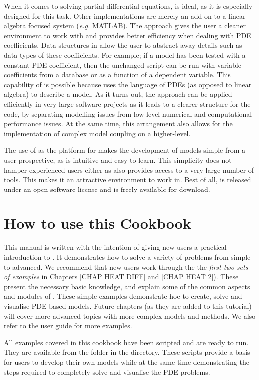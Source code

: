 When it comes to solving partial differential equations, \esc is ideal, as it is especially designed for this task. Other implementations are merely an add-on to a linear algebra focused system (\textit{e.g.} MATLAB). The \esc approach gives the user a cleaner environment to work with and provides better efficiency when dealing with PDE coefficients. Data structures in \esc allow the user to abstract away details such as data types of these coefficients. For example; if a model has been tested with a constant PDE coefficient, then the unchanged script can be run with variable coefficients from a database or as a function of a dependent variable. This capability of \esc is possible because \esc uses the language of PDEs (as opposed to linear algebra) to describe a model. As it turns out, the \esc approach can be applied efficiently in very large software projects as it leads to a clearer structure for the code, by separating modelling issues from low-level numerical and computational performance issues.  At the same time, this arrangement also allows for the implementation of complex model coupling on a higher-level. 

The use of \pyt as the platform for \esc makes the development of models  simple from a user prospective, as \pyt is intuitive and easy to learn. This simplicity does not hamper experienced users either as \pyt also provides access to a very large number of tools. This makes it an attractive environment to work in. Best of all, \esc is released under an open software license and is freely available for download.

\section{How to use this Cookbook}
This manual is written with the intention of giving new users a practical introduction to \esc. It demonstrates how to solve a variety of problems from simple to advanced. We recommend that new users work through the
the \textit{first two sets of examples} in Chapters \ref{CHAP HEAT DIFF} and \ref{CHAP HEAT 2}).
These present the necessary basic knowledge, and explain some of the common aspects and modules of \esc. These simple examples demonstrate hoe to create, solve and visualise PDE based models. 
Future chapters (as they are added to this tutorial) will cover more advanced topics with more complex models and methods. We also refer to the \esc user guide for more examples.

All examples covered in this cookbook have been scripted and are ready to run. They are available from the \exf folder in the \esc directory. These scripts provide a basis for users to develop their own models while at the same time demonstrating the steps required to completely solve and visualise the PDE problems.




